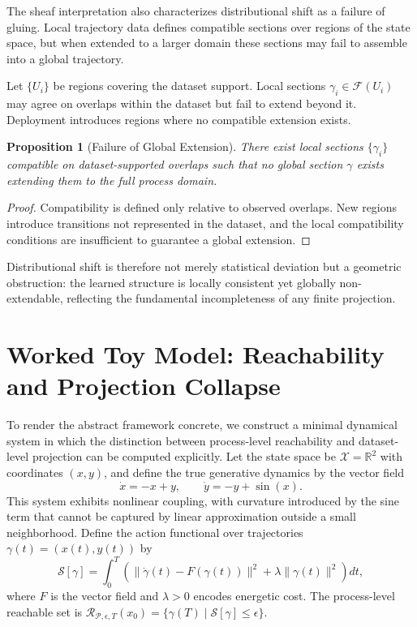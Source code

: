 \documentclass[12pt]{article}
\theoremstyle{plain}
\newtheorem{proposition}[theorem]{Proposition}
\theoremstyle{definition}
\theoremstyle{remark}
\begin{document}
The sheaf interpretation also characterizes distributional shift as a failure of gluing. Local trajectory data defines compatible sections over regions of the state space, but when extended to a larger domain these sections may fail to assemble into a global trajectory.

Let $\{U_i\}$ be regions covering the dataset support. Local sections $\gamma_i \in \mathcal{F}(U_i)$ may agree on overlaps within the dataset but fail to extend beyond it. Deployment introduces regions where no compatible extension exists.

\begin{proposition}[Failure of Global Extension]
There exist local sections $\{\gamma_i\}$ compatible on dataset-supported overlaps such that no global section $\gamma$ exists extending them to the full process domain.
\end{proposition}

\begin{proof}
Compatibility is defined only relative to observed overlaps. New regions introduce transitions not represented in the dataset, and the local compatibility conditions are insufficient to guarantee a global extension.
\end{proof}

Distributional shift is therefore not merely statistical deviation but a geometric obstruction: the learned structure is locally consistent yet globally non-extendable, reflecting the fundamental incompleteness of any finite projection.

\section{Worked Toy Model: Reachability and Projection Collapse}

To render the abstract framework concrete, we construct a minimal dynamical system in which the distinction between process-level reachability and dataset-level projection can be computed explicitly. Let the state space be $\mathcal{X} = \mathbb{R}^2$ with coordinates $(x,y)$, and define the true generative dynamics by the vector field
\[
\dot{x} = -x + y, \qquad \dot{y} = -y + \sin(x).
\]
This system exhibits nonlinear coupling, with curvature introduced by the sine term that cannot be captured by linear approximation outside a small neighborhood. Define the action functional over trajectories $\gamma(t) = (x(t),y(t))$ by
\[
\mathcal{S}[\gamma] = \int_0^T \left( \|\dot{\gamma}(t) - F(\gamma(t))\|^2 + \lambda \|\gamma(t)\|^2 \right) dt,
\]
where $F$ is the vector field and $\lambda > 0$ encodes energetic cost. The process-level reachable set is $\mathcal{R}_{\mathcal{P},\epsilon,T}(x_0) = \{\gamma(T) \mid \mathcal{S}[\gamma] \le \epsilon\}$.
\end{document}
